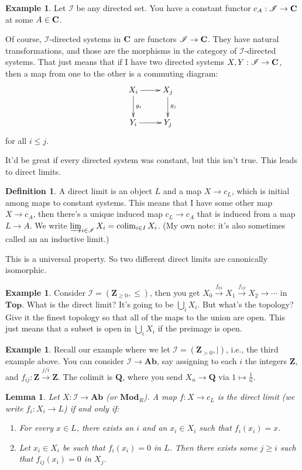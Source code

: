 \documentclass{amsart}
\theoremstyle{theorem}
\newtheorem{lemma}[theorem]{Lemma}
\theoremstyle{definition}
\newtheorem{definition}[theorem]{Definition}
\newtheorem{example}[theorem]{Example}
\DeclareMathOperator{\colim}{colim}
\def\cI{\mathscr I}\def\cJ{\mathscr J}\def\cK{\mathscr K}\def\cL{\mathscr L}
\def\QQ{\mathbf Q}\def\RR{\mathbf R}\def\SS{\mathbb S}\def\TT{\mathbb T}
\newcommand{\Z}{\mathbf Z}
\begin{document}
\begin{example}
Let $\cI$ be any directed set. You have a constant functor $c_A:\cI\to\cc$ at some $A\in\mathbf C$.
\end{example}
Of course, $\cI$-directed systems in $\mathbf C$ are functors $\cI\to\cc$. They have natural transformations, and those are the morphisms in the category of $\cI$-directed systems. That just means that if I have two directed systems $X,Y:\cI\to\cc$, then a map from one to the other is a commuting diagram:
\begin{equation*}
\xymatrix{X_i\ar[r]\ar[d]^{g_i} & X_j\ar[d]^{g_j}\\
Y_i\ar[r] & Y_j}
\end{equation*}
for all $i\leq j$.

It'd be great if every directed system was constant, but this isn't true. This leads to direct limits.
\begin{definition}
A direct limit is an object $L$ and a map $X\to c_L$, which is initial among maps to constant systems. This means that I have some other map $X\to c_A$, then there's a unique induced map $c_L\to c_A$ that is induced from a map $L\to A$. We write $\varinjlim_{i\in \cI}X_i=\colim_{i\in I}X_i$. (My own note: it's also sometimes called an an inductive limit.)
\end{definition}
This is a universal property. So two different direct limits are canonically isomorphic.
\begin{example}
Consider $\cI=(\Z_{\geq 0},\leq)$, then you get $X_0\xrightarrow{f_{01}}X_1\xrightarrow{f_{12}}X_2\to\cdots$ in $\mathbf{Top}$. What is the direct limit? It's going to be $\bigcup_i X_i$. But what's the topology? Give it the finest topology so that all of the maps to the union are open. This just means that a subset is open in $\bigcup_i X_i$ if the preimage is open.
\end{example}
\begin{example}
Recall our example where we let $\cI=(\Z_{>0},|)$, i.e., the third example above. You can consider $\cI\to\mathbf{Ab}$, say assigning to each $i$ the integers $\Z$, and $f_{ij}:\Z\xrightarrow{j/i}\Z$. The colimit is $\QQ$, where you send $X_n\to\QQ$ via $1\mapsto \frac{1}{n}$.
\end{example}
\begin{lemma}
Let $X:\cI\to\mathbf{Ab}$ (or $\mathbf{Mod}_R$). A map $f:X\to c_L$ is the direct limit (we write $f_i:X_i\to L$) if and only if:
\begin{enumerate}
\item For every $x\in L$, there exists an $i$ and an $x_i\in X_i$ such that $f_i(x_i)=x$.
\item Let $x_i\in X_i$ be such that $f_i(x_i)=0$ in $L$. Then there exists some $j\geq i$ such that $f_{ij}(x_i)=0$ in $X_j$.
\end{enumerate}
\end{lemma}
\end{document}
